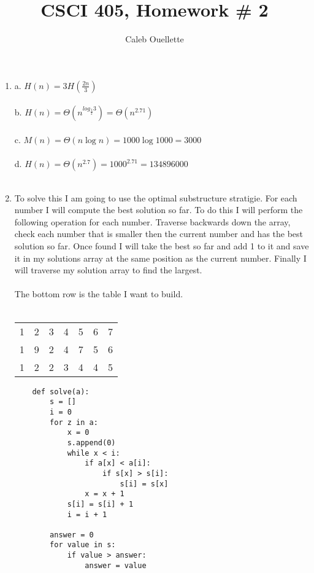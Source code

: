 \documentclass{article}
\title{CSCI 405, Homework \# 2}
\author{Caleb Ouellette}
\begin{document}
  
  \maketitle
  \begin{enumerate}
  \item 
      
      a. $H(n) = 3H(\frac{2n}{3})$ \\
      \\
      b. $H(n) = \Theta(n^{log_{\frac{3}{2}}3}) = \Theta(n^{2.71}) $ \\
      \\
      c. $M(n) = \Theta(n\log n) = 1000 \log 1000 = 3000$ \\
      \\
      d. $H(n) = \Theta(n^{2.7}) = 1000^{2.71} = 134896000$ \\
      \\
  
  \item 
    To solve this I am going to use the optimal substructure stratigie. For each number I will compute
    the best solution so far. To do this I will perform the following operation for each number. Traverse backwards down the array, 
    check each number that is smaller then the current number and has the best solution so far. Once found I will take the best so 
    far and add 1 to it and save it in my solutions array at the same position as the current number. 
    Finally I will traverse my solution array to find the largest.\\ 
    \\
    The bottom row is the table I want to build. 
    \\
    \\
    \begin{tabular}{lllllll}
    1 & 2  & 3  & 4  & 5  & 6 & 7  \\
    1 & 9  & 2  & 4  & 7  & 5 & 6  \\
    1 & 2  & 2  & 3  & 4  & 4 & 5  \\
    \end{tabular}
    \begin{lstlisting}
    def solve(a):
        s = []
        i = 0
        for z in a:
            x = 0
            s.append(0)
            while x < i:
                if a[x] < a[i]:
                    if s[x] > s[i]:
                        s[i] = s[x]
                x = x + 1
            s[i] = s[i] + 1
            i = i + 1

        answer = 0
        for value in s:
            if value > answer:
                answer = value


\end{lstlisting}
\end{enumerate}
\end{document}
